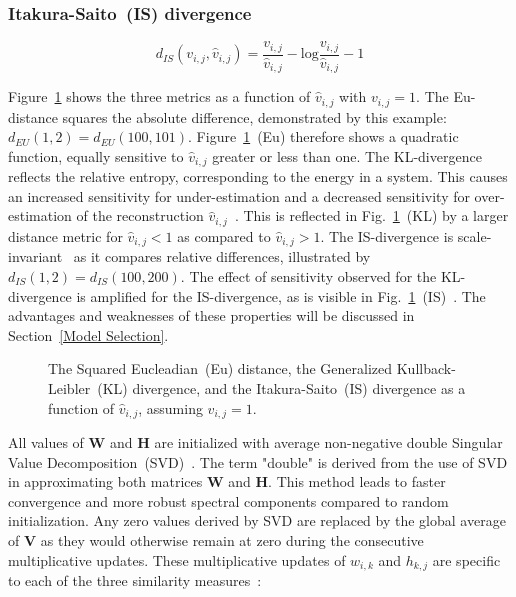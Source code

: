 \documentclass[lettersize,journal]{IEEEtran}
\begin{document}
\subsubsection{Itakura-Saito~(IS) divergence~\cite{cao1999cross}}
\begin{equation}
    d_{IS}({v}_{i,j}, \hat{v}_{i,j}) =  \frac{{v}_{i,j}}{\hat{v}_{i,j}}- \text{log} \frac{{v}_{i,j}}{\hat{v}_{i,j}} - 1
    \label{dIS}
\end{equation}


Figure~\ref{dist_measures} shows the three metrics as a function of $\hat{v}_{i,j}$ with $v_{i,j}=1$. 
The Eu-distance squares the absolute difference, demonstrated by this example: $d_{EU}(1,2) = d_{EU}(100,101)$.
Figure~\ref{dist_measures}~(Eu) therefore shows a quadratic function, equally sensitive to $\hat{v}_{i,j}$ greater or less than one.
The KL-divergence reflects the relative entropy, corresponding to the energy in a system. This causes an increased sensitivity for under-estimation and a decreased sensitivity for over-estimation of the reconstruction $\hat{v}_{i,j}$~\cite{kompass2007generalized}. This is reflected in Fig.~\ref{dist_measures}~(KL) by a larger distance metric for $\hat{v}_{i,j}<1$ as compared to $\hat{v}_{i,j}>1$.
The IS-divergence is scale-invariant~\cite{fevotte2009nonnegative} as it compares relative differences, illustrated by $d_{IS}(1,2) = d_{IS}(100,200)$.
The effect of sensitivity observed for the KL-divergence is amplified for the IS-divergence, as is visible in Fig.~\ref{dist_measures}~(IS)~\cite{cao1999cross}.
The advantages and weaknesses of these properties will be discussed in Section~\ref{Model Selection}.
\begin{figure}[]
    \centering 
    \vspace{-10pt}
    
    \vspace{-10pt}
    \caption{The Squared Eucleadian~(Eu) distance, the Generalized Kullback-Leibler~(KL) divergence, and the Itakura-Saito~(IS) divergence as a function of $\hat{v}_{i,j}$, assuming $v_{i,j}=1$.}
    \label{dist_measures}
\end{figure}

All values of $\mathbf{W}$ and $\mathbf{H}$ are initialized with average non-negative double Singular Value Decomposition~(SVD)~\cite{BOUTSIDIS20081350}. 
The term "double" is derived from the use of SVD in approximating both matrices $\mathbf{W}$ and $\mathbf{H}$.
This method leads to faster convergence and more robust spectral components compared to random initialization. 
Any zero values derived by SVD are replaced by the global average of $\mathbf{V}$ as they would otherwise remain at zero during the consecutive multiplicative updates. 
These multiplicative updates of $w_{i,k}$ and $h_{k,j}$ are specific to each of the three similarity measures~\cite{sawada2013multichannel}: 
\end{document}
